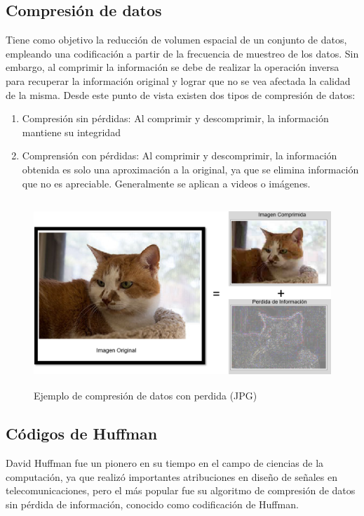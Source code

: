 \documentclass[12pt,twoside]{article}
\begin{document}
    \subsection{Compresión de datos}
    
    Tiene como objetivo la reducción de volumen espacial de un conjunto de datos, empleando una codificación a partir de la frecuencia de muestreo de los datos. Sin embargo, al comprimir la información se debe de realizar la operación inversa para recuperar la información original y lograr que no se vea afectada la calidad de la misma. Desde este punto de vista existen dos tipos de compresión de datos:\\
    
    \begin{enumerate}
    \item Compresión sin pérdidas: Al comprimir y descomprimir, la información mantiene su integridad\\
    \item Comprensión con pérdidas: Al comprimir y descomprimir, la información obtenida es solo una aproximación a la original, ya que se elimina información que no es apreciable. Generalmente se aplican a videos o imágenes.
    \end{enumerate}
    
   
    \begin{figure}[H]
            \centering
            \includegraphics[height=7cm]{imagenes/c2.png}
            \caption{Ejemplo de compresión de datos con perdida (JPG)}
        \end{figure}
    \subsection{Códigos de Huffman}
    David Huffman fue un pionero en su tiempo en el campo de ciencias de la computación, ya que realizó importantes atribuciones en diseño de señales en telecomunicaciones, pero el más popular fue su algoritmo de compresión de datos sin pérdida de información, conocido como codificación de Huffman.
    
\end{document}
